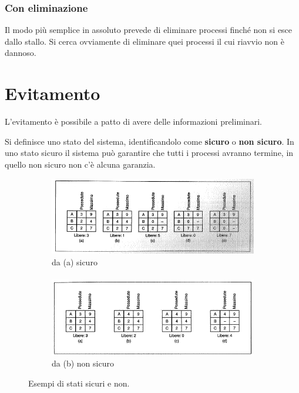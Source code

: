 \subsubsection{Con eliminazione}
Il modo più semplice in assoluto prevede di eliminare processi finché non si esce dallo stallo. Si cerca ovviamente di eliminare quei processi il cui riavvio non è dannoso.

\section{Evitamento}
L'evitamento è possibile a patto di avere delle informazioni preliminari.

Si definisce uno stato del sistema, identificandolo come \textbf{sicuro} o \textbf{non sicuro}. In uno stato sicuro il sistema può garantire che tutti i processi avranno termine, in quello non sicuro non c'è alcuna garanzia. 


\begin{figure}[H]
    \centering
    \begin{subfigure}{.9\textwidth}
    \centering
      \includegraphics[width=1\linewidth]{assets/sicuro9.png}
      \caption{da (a) sicuro}
    \end{subfigure}
    \paragraph*{}
    \begin{subfigure}{.9\textwidth}
    \centering
      \includegraphics[width=1\linewidth]{assets/nonsicuro9.png}
      \caption{ da (b) non sicuro}
    \end{subfigure}
    \caption{Esempi di stati sicuri e non.}
\end{figure}

